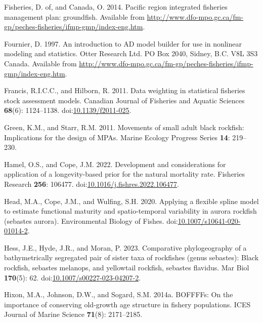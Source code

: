 \documentclass[11pt,
  english,
  letterpaper,
]{article}
\newlength{\cslhangindent}
\newenvironment{CSLReferences}[2] %
 {%
  \setlength{\parindent}{0pt}
  \ifodd #1 \everypar{\setlength{\hangindent}{\cslhangindent}}\ignorespaces\fi
  \ifnum #2 > 0
  \setlength{\parskip}{#2\baselineskip}
  \fi
 }%
 {}
\begin{document}
\begin{CSLReferences}{1}{0}
\leavevmode{}%
Fisheries, D. of, and Canada, O. 2014. Pacific region integrated fisheries management plan: groundfish. Available from \url{http://www.dfo-mpo.gc.ca/fm-gp/peches-fisheries/ifmp-gmp/index-eng.htm}.

\leavevmode{}%
Fournier, D. 1997. An introduction to AD model builder for use in nonlinear modeling and statistics. Otter Research Ltd. PO Box 2040, Sidney, B.C. V8L 3S3 Canada. Available from \url{http://www.dfo-mpo.gc.ca/fm-gp/peches-fisheries/ifmp-gmp/index-eng.htm}.

\leavevmode{}%
Francis, R.I.C.C., and Hilborn, R. 2011. Data weighting in statistical fisheries stock assessment models. Canadian Journal of Fisheries and Aquatic Sciences \textbf{68}(6): 1124--1138. doi:\href{https://doi.org/10.1139/f2011-025}{10.1139/f2011-025}.

\leavevmode{}%
Green, K.M., and Starr, R.M. 2011. Movements of small adult black rockfish: Implications for the design of MPAs. Marine Ecology Progress Series \textbf{14}: 219--230.

\leavevmode{}%
Hamel, O.S., and Cope, J.M. 2022. Development and considerations for application of a longevity-based prior for the natural mortality rate. Fisheries Research \textbf{256}: 106477. doi:\href{https://doi.org/10.1016/j.fishres.2022.106477}{10.1016/j.fishres.2022.106477}.

\leavevmode{}%
Head, M.A., Cope, J.M., and Wulfing, S.H. 2020. Applying a flexible spline model to estimate functional maturity and spatio-temporal variability in aurora rockfish (sebastes aurora). Environmental Biology of Fishes. doi:\href{https://doi.org/10.1007/s10641-020-01014-2}{10.1007/s10641-020-01014-2}.

\leavevmode{}%
Hess, J.E., Hyde, J.R., and Moran, P. 2023. Comparative phylogeography of a bathymetrically segregated pair of sister taxa of rockfishes (genus sebastes): Black rockfish, sebastes melanops, and yellowtail rockfish, sebastes flavidus. Mar Biol \textbf{170}(5): 62. doi:\href{https://doi.org/10.1007/s00227-023-04207-2}{10.1007/s00227-023-04207-2}.

\leavevmode{}%
Hixon, M.A., Johnson, D.W., and Sogard, S.M. 2014a. BOFFFFs: On the importance of conserving old-growth age structure in fishery populations. ICES Journal of Marine Science \textbf{71}(8): 2171--2185.


\end{CSLReferences}
\end{document}
